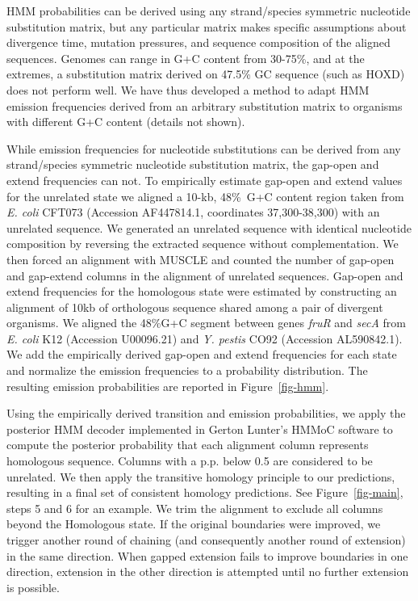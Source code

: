 \documentclass{llncs}
\begin{document}
HMM probabilities can be derived using any strand/species symmetric nucleotide substitution matrix,
but any particular matrix makes specific assumptions about divergence time, mutation pressures,
and sequence composition of the aligned sequences.
Genomes can range in G+C content from 30-75\%, and at the extremes,
a substitution matrix derived on 47.5\% GC sequence (such as HOXD) does not
perform well.  We have thus developed a method to adapt HMM emission
frequencies derived from an arbitrary substitution matrix
to organisms with different G+C content (details not shown).  

While emission frequencies for nucleotide substitutions can be derived from
any strand/species symmetric nucleotide substitution matrix, the gap-open
and extend frequencies can not.  To empirically estimate gap-open and extend values
for the unrelated state we aligned a 10-kb, 48\%~G+C content region
taken from \emph{E. coli} CFT073 (Accession AF447814.1, coordinates
37,300-38,300) with an unrelated sequence.  We generated an unrelated
sequence with identical nucleotide composition by reversing the
extracted sequence without complementation.  We then forced an
alignment with MUSCLE and counted the number of gap-open and gap-extend
columns in the alignment of unrelated sequences.  Gap-open and
extend frequencies for the homologous state were estimated by
constructing an alignment of 10kb of orthologous sequence shared among
a pair of divergent organisms.  We aligned the 48\%G+C segment between
genes \textit{fruR} and \textit{secA} from \textit{E. coli} K12
(Accession U00096.21) and \emph{Y. pestis} CO92 (Accession
AL590842.1). We add the empirically derived gap-open and extend
frequencies for each state and normalize the emission frequencies to a
probability distribution.  The resulting emission probabilities are
reported in Figure~\ref{fig-hmm}.

Using the empirically derived transition and emission probabilities,
we apply the posterior HMM decoder implemented in Gerton Lunter's
HMMoC software\cite{Lunter2007} to compute the posterior probability that
each alignment column represents homologous sequence.  Columns with a
p.p. below 0.5 are considered to be unrelated.  We then apply the
transitive homology principle to our predictions, resulting in a final
set of consistent homology predictions.  See Figure~\ref{fig-main},
steps 5 and 6 for an example. We trim the alignment to exclude all
columns beyond the Homologous state. If the original boundaries were
improved, we trigger another round of chaining (and consequently
another round of extension) in the same direction.
When gapped extension fails to improve boundaries
in one direction, extension in the other direction is attempted until
no further extension is possible.
\end{document}
